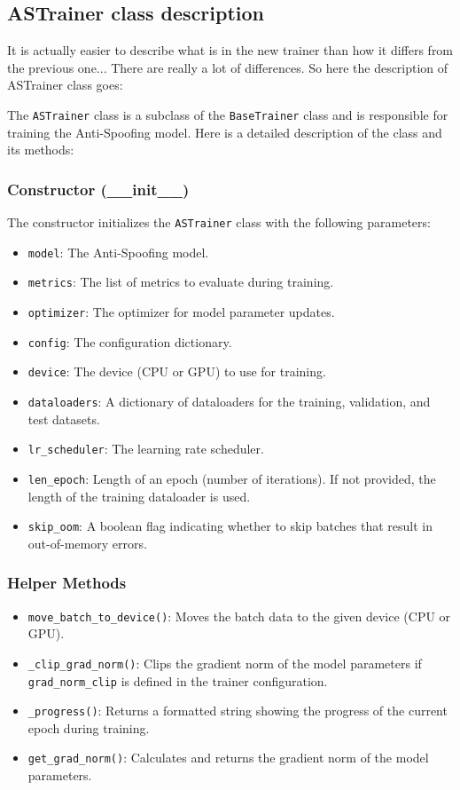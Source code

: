 \documentclass[a4paper]{article}
\begin{document}
\subsection{ASTrainer class description}

It is actually easier to describe what is in the new trainer than how it differs from the previous one... There are really a lot of differences. So here the description of ASTrainer class goes:

The \texttt{ASTrainer} class is a subclass of the \texttt{BaseTrainer} class and is responsible for training the Anti-Spoofing model. Here is a detailed description of the class and its methods:

\subsubsection{Constructor (\_\_init\_\_)}

The constructor initializes the \texttt{ASTrainer} class with the following parameters:

\begin{itemize}
    \item \texttt{model}: The Anti-Spoofing model.
    \item \texttt{metrics}: The list of metrics to evaluate during training.
    \item \texttt{optimizer}: The optimizer for model parameter updates.
    \item \texttt{config}: The configuration dictionary.
    \item \texttt{device}: The device (CPU or GPU) to use for training.
    \item \texttt{dataloaders}: A dictionary of dataloaders for the training, validation, and test datasets.
    \item \texttt{lr\_scheduler}: The learning rate scheduler.
    \item \texttt{len\_epoch}: Length of an epoch (number of iterations). If not provided, the length of the training dataloader is used.
    \item \texttt{skip\_oom}: A boolean flag indicating whether to skip batches that result in out-of-memory errors.
\end{itemize}

\subsubsection{Helper Methods}

\begin{itemize}
    \item \texttt{move\_batch\_to\_device()}: Moves the batch data to the given device (CPU or GPU).
    \item \texttt{\_clip\_grad\_norm()}: Clips the gradient norm of the model parameters if \texttt{grad\_norm\_clip} is defined in the trainer configuration.
    \item \texttt{\_progress()}: Returns a formatted string showing the progress of the current epoch during training.
    \item \texttt{get\_grad\_norm()}: Calculates and returns the gradient norm of the model parameters.
\end{itemize}
\end{document}
